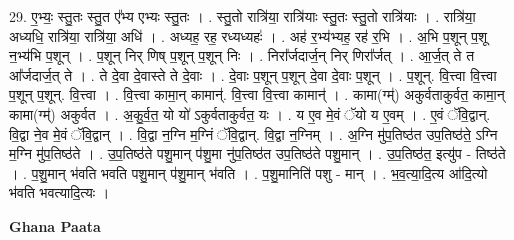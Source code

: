\documentclass[17pt]{extarticle}
\begin{document}
29. ए॒भ्यः॒ स्तु॒तः स्तु॒त ए᳚भ्य एभ्यः स्तु॒तः । . स्तु॒तो रात्रि॑या॒ रात्रि॑याः स्तु॒तः स्तु॒तो रात्रि॑याः । . रात्रि॑या॒ अध्यधि॒ रात्रि॑या॒ रात्रि॑या॒ अधि॑ । . अध्यह॒ रह॒ रध्यध्यहः॑ । . अह॑ र॒भ्य॑भ्यह॒ रह॑ र॒भि । . अ॒भि प॒शून् प॒शू न॒भ्य॑भि प॒शून् । . प॒शून् निर् णिष् प॒शून् प॒शून् निः । . निरा᳚र्जदार्ज॒न् निर् णिरा᳚र्जत् । . आ॒र्ज॒त् ते त आ᳚र्जदार्ज॒त् ते । . ते दे॒वा दे॒वास्ते ते दे॒वाः । . दे॒वाः प॒शून् प॒शून् दे॒वा दे॒वाः प॒शून् । . प॒शून्. वि॒त्त्वा वि॒त्त्वा प॒शून् प॒शून्. वि॒त्त्वा । . वि॒त्त्वा कामा॒न् कामान्॑. वि॒त्त्वा वि॒त्त्वा कामान्॑ । . कामा(ग्म्॑) अकुर्वताकुर्वत॒ कामा॒न् कामा(ग्म्॑) अकुर्वत । . अ॒कु॒र्व॒त॒ यो यो॑ ऽकुर्वताकुर्वत॒ यः । . य ए॒व मे॒वं ॅयो य ए॒वम् । . ए॒वं ॅवि॒द्वान्. वि॒द्वा ने॒व मे॒वं ॅवि॒द्वान् । . वि॒द्वा न॒ग्नि म॒ग्निं ॅवि॒द्वान्. वि॒द्वा न॒ग्निम् । . अ॒ग्नि मु॑प॒तिष्ठ॑त उप॒तिष्ठ॑ते॒ ऽग्नि म॒ग्नि मु॑प॒तिष्ठ॑ते । . उ॒प॒तिष्ठ॑ते पशु॒मान् प॑शु॒मा नु॑प॒तिष्ठ॑त उप॒तिष्ठ॑ते पशु॒मान् । . उ॒प॒तिष्ठ॑त॒ इत्यु॑प - तिष्ठ॑ते । . प॒शु॒मान् भ॑वति भवति पशु॒मान् प॑शु॒मान् भ॑वति । . प॒शु॒मानिति॑ पशु - मान् । . भ॒व॒त्या॒दि॒त्य आ॑दि॒त्यो भ॑वति भवत्यादि॒त्यः । \newline

\textbf{Ghana Paata } \newline
\end{document}
